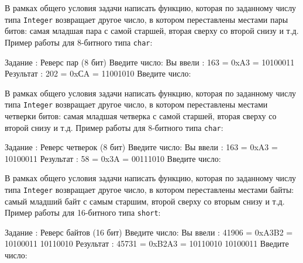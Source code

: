 
\begin{zztask}
В рамках общего условия задачи написать функцию, которая по заданному числу
типа \texttt{Integer} возвращает другое число, в котором переставлены
местами пары битов: самая младшая пара с самой старшей, вторая
сверху со второй снизу и т.д.
Пример работы для 8-битного типа \texttt{char}:
\begin{zzoutput}
  Задание \thezztask: Реверс пар (8 бит)
  Введите число: 
  Вы ввели  :  163 = 0xA3 = 10100011
  Результат :  202 = 0xСA = 11001010
  Введите число: \zzuser{ }
\end{zzoutput}
\end{zztask}


\begin{zztask}
В рамках общего условия задачи написать функцию, которая по заданному числу
типа \texttt{Integer} возвращает другое число, в котором переставлены
местами четверки битов: самая младшая четверка с самой старшей, вторая
сверху со второй снизу и т.д.
Пример работы для 8-битного типа \texttt{char}:
\begin{zzoutput}
  Задание \thezztask: Реверс четверок (8 бит)
  Введите число: 
  Вы ввели  :  163 = 0xA3 = 10100011
  Результат :   58 = 0x3A = 00111010
  Введите число: \zzuser{ }
\end{zzoutput}
\end{zztask}


\begin{zztask}
В рамках общего условия задачи написать функцию, которая по заданному числу
типа \texttt{Integer} возвращает другое число, в котором переставлены
местами байты: самый младший байт с самым старшим, второй сверху со вторым
снизу и т.д.
Пример работы для 16-битного типа \texttt{short}:
\begin{zzoutput}
  Задание \thezztask: Реверс байтов (16 бит)
  Введите число: 
  Вы ввели  : 41906 = 0xA3B2 = 10100011 10110010
  Результат : 45731 = 0xB2A3 = 10110010 10100011
  Введите число: \zzuser{ }
\end{zzoutput}
\end{zztask}

